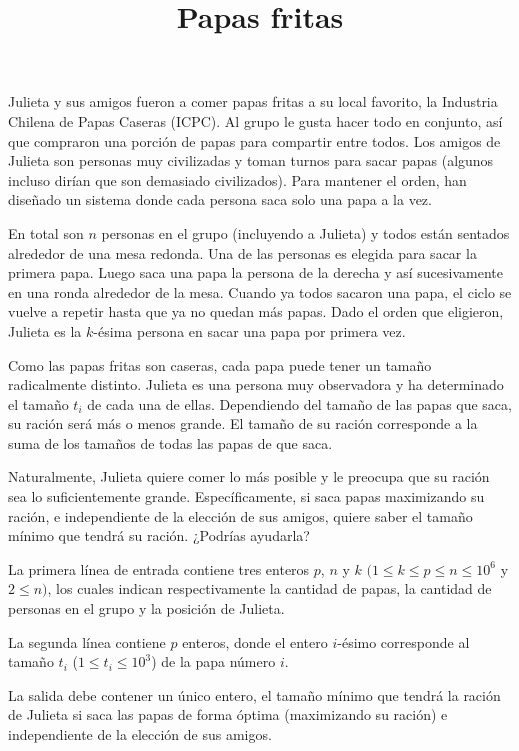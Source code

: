 \documentclass{oci}
\title{Papas fritas}
\begin{document}
\begin{problemDescription}
	Julieta y sus amigos fueron a comer papas fritas a su local favorito,
	la Industria Chilena de Papas Caseras (ICPC).
	Al grupo le gusta hacer todo en conjunto, así que compraron una porción
	de papas para compartir entre todos.
	Los amigos de Julieta son personas muy civilizadas y toman turnos para
	sacar papas (algunos incluso dirían que son demasiado civilizados).
	Para mantener el orden, han diseñado un sistema donde cada
	persona saca solo una papa a la vez.

	En total son $n$ personas en el grupo (incluyendo a Julieta) y todos están
	sentados alrededor de una mesa redonda.
	Una de las personas es elegida para sacar la primera papa.
	Luego saca una papa la persona de la derecha y así sucesivamente en una
	ronda alrededor de la mesa.
	Cuando ya todos sacaron una papa, el ciclo se vuelve a repetir hasta que ya no
	quedan más papas.
	Dado el orden que eligieron, Julieta es la $k$-ésima persona en sacar una papa
	por primera vez.

	Como las papas fritas son caseras, cada papa puede tener un tamaño radicalmente
	distinto.
	Julieta es una persona muy observadora y ha determinado el tamaño $t_i$ de cada una
	de ellas.
	Dependiendo del tamaño de las papas que saca, su ración será más o menos grande.
	El tamaño de su ración corresponde a la suma de los tamaños de todas
	las papas de que saca.

	Naturalmente, Julieta quiere comer lo más posible y le preocupa que su ración
	sea lo suficientemente grande.
	Específicamente, si saca papas maximizando su ración, e independiente
	de la elección de sus amigos, quiere saber el tamaño mínimo que tendrá su ración.
	¿Podrías ayudarla?
\end{problemDescription}

\begin{inputDescription}
	La primera línea de entrada contiene tres enteros $p$, $n$ y $k$
	$(1 \leq k \leq p \leq n \leq 10^6$ y $2 \leq n)$, los cuales
	indican respectivamente la cantidad de papas, la cantidad de personas en el grupo
	y la posición de Julieta.

	La segunda línea contiene $p$ enteros, donde el entero $i$-ésimo
	corresponde al tamaño $t_i$ ($1 \leq t_i \leq 10^3$) de la papa número $i$.
\end{inputDescription}

\begin{outputDescription}
	La salida debe contener un único entero, el tamaño mínimo que tendrá la ración
	de Julieta si saca las papas de forma óptima (maximizando su ración) e independiente
	de la elección de sus amigos.
\end{outputDescription}
\end{document}

